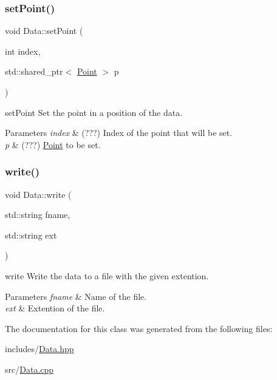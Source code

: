 \subsubsection{\texorpdfstring{set\+Point()}{setPoint()}}
{\footnotesize\ttfamily void Data\+::set\+Point (\begin{DoxyParamCaption}\item[{int}]{index,  }\item[{std\+::shared\+\_\+ptr$<$ \hyperlink{class_point}{Point} $>$}]{p }\end{DoxyParamCaption})}



set\+Point Set the point in a position of the data. 


\begin{DoxyParams}{Parameters}
{\em index} & (???) Index of the point that will be set. \\
\hline
{\em p} & (???) \hyperlink{class_point}{Point} to be set. \\
\hline
\end{DoxyParams}
\mbox{\label{class_data_a6550f72555320ae9225ba216a9f4e7b3}} 
\subsubsection{\texorpdfstring{write()}{write()}}
{\footnotesize\ttfamily void Data\+::write (\begin{DoxyParamCaption}\item[{std\+::string}]{fname,  }\item[{std\+::string}]{ext }\end{DoxyParamCaption})}



write Write the data to a file with the given extention. 


\begin{DoxyParams}{Parameters}
{\em fname} & Name of the file. \\
\hline
{\em ext} & Extention of the file. \\
\hline
\end{DoxyParams}


The documentation for this class was generated from the following files\+:\begin{DoxyCompactItemize}
\item 
includes/\hyperlink{_data_8hpp}{Data.\+hpp}\item 
src/\hyperlink{_data_8cpp}{Data.\+cpp}\end{DoxyCompactItemize}
